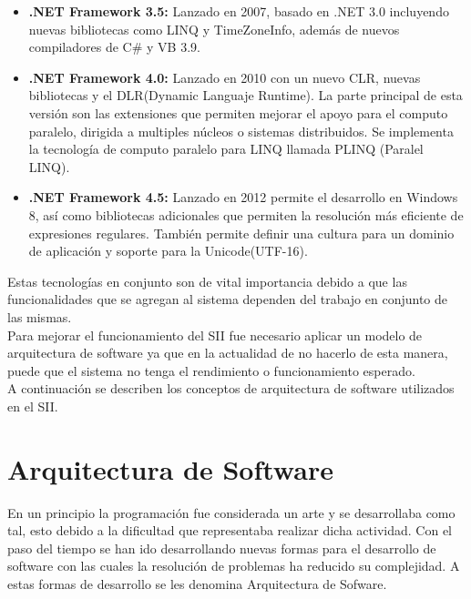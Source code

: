 \begin{itemize}
			\item \textbf{.NET Framework 3.5: } Lanzado en 2007, basado en .NET 3.0 incluyendo nuevas bibliotecas como LINQ y TimeZoneInfo, adem\'as de nuevos compiladores de C\# y VB 3.9.

			\item \textbf{.NET Framework 4.0: } Lanzado en 2010 con un nuevo CLR, nuevas bibliotecas y el DLR(Dynamic Languaje Runtime). La parte principal de esta versi\'on son las extensiones que permiten mejorar el apoyo para el computo paralelo, dirigida a multiples n\'ucleos o sistemas distribuidos. Se implementa la tecnolog\'ia de computo paralelo para LINQ llamada PLINQ (Paralel LINQ).

			\item \textbf{.NET Framework 4.5: } Lanzado en 2012 permite el desarrollo en Windows 8, as\'i como bibliotecas adicionales que permiten la resoluci\'on m\'as eficiente de expresiones regulares. Tambi\'en permite definir una cultura para un dominio de aplicaci\'on y soporte para la Unicode(UTF-16).

		\end{itemize}

Estas tecnolog\'ias en conjunto son de vital importancia debido a que las funcionalidades que se agregan al sistema dependen del trabajo en conjunto de las mismas.\\

Para mejorar el funcionamiento del SII fue necesario aplicar un modelo  de arquitectura de software ya que en la actualidad de no hacerlo de esta manera, puede que el sistema no tenga el rendimiento o funcionamiento esperado.\\

A continuaci\'on se describen los conceptos de arquitectura de software utilizados en el SII.\\



\section{Arquitectura de Software}

	En un principio la programaci\'on fue considerada un arte  y se desarrollaba como tal, esto debido a la dificultad que representaba realizar dicha actividad. Con el paso del tiempo se han ido desarrollando nuevas formas para el desarrollo de software con las cuales la resoluci\'on de problemas ha reducido su complejidad. A estas formas de desarrollo se les denomina Arquitectura de Sofware.\\

